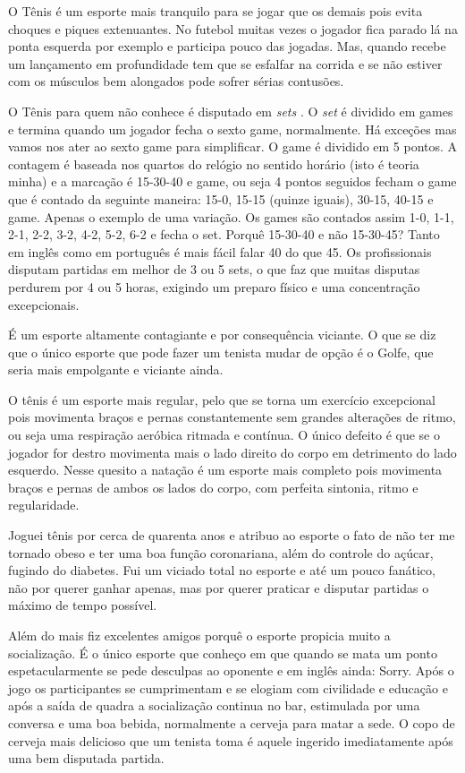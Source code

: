 \documentclass[12pt,brazil,]{book}
\begin{document}
O Tênis é um esporte mais tranquilo para se jogar que os demais pois
evita choques e piques extenuantes. No futebol muitas vezes o jogador
fica parado lá na ponta esquerda por exemplo e participa pouco das
jogadas. Mas, quando recebe um lançamento em profundidade tem que se
esfalfar na corrida e se não estiver com os músculos bem alongados pode
sofrer sérias contusões.

O Tênis para quem não conhece é disputado em \emph{sets} . O \emph{set}
é dividido em games e termina quando um jogador fecha o sexto game,
normalmente. Há exceções mas vamos nos ater ao sexto game para
simplificar. O game é dividido em 5 pontos. A contagem é baseada nos
quartos do relógio no sentido horário (isto é teoria minha) e a marcação
é 15-30-40 e game, ou seja 4 pontos seguidos fecham o game que é contado
da seguinte maneira: 15-0, 15-15 (quinze iguais), 30-15, 40-15 e game.
Apenas o exemplo de uma variação. Os games são contados assim 1-0, 1-1,
2-1, 2-2, 3-2, 4-2, 5-2, 6-2 e fecha o set. Porquê 15-30-40 e não
15-30-45? Tanto em inglês como em português é mais fácil falar 40 do que
45. Os profissionais disputam partidas em melhor de 3 ou 5 sets, o que
faz que muitas disputas perdurem por 4 ou 5 horas, exigindo um preparo
físico e uma concentração excepcionais.

É um esporte altamente contagiante e por consequência viciante. O que se
diz que o único esporte que pode fazer um tenista mudar de opção é o
Golfe, que seria mais empolgante e viciante ainda.

O tênis é um esporte mais regular, pelo que se torna um exercício
excepcional pois movimenta braços e pernas constantemente sem grandes
alterações de ritmo, ou seja uma respiração aeróbica ritmada e contínua.
O único defeito é que se o jogador for destro movimenta mais o lado
direito do corpo em detrimento do lado esquerdo. Nesse quesito a natação
é um esporte mais completo pois movimenta braços e pernas de ambos os
lados do corpo, com perfeita sintonia, ritmo e regularidade.

Joguei tênis por cerca de quarenta anos e atribuo ao esporte o fato de
não ter me tornado obeso e ter uma boa função coronariana, além do
controle do açúcar, fugindo do diabetes. Fui um viciado total no esporte
e até um pouco fanático, não por querer ganhar apenas, mas por querer
praticar e disputar partidas o máximo de tempo possível.

Além do mais fiz excelentes amigos porquê o esporte propicia muito a
socialização. É o único esporte que conheço em que quando se mata um
ponto espetacularmente se pede desculpas ao oponente e em inglês ainda:
Sorry. Após o jogo os participantes se cumprimentam e se elogiam com
civilidade e educação e após a saída de quadra a socialização continua
no bar, estimulada por uma conversa e uma boa bebida, normalmente a
cerveja para matar a sede. O copo de cerveja mais delicioso que um
tenista toma é aquele ingerido imediatamente após uma bem disputada
partida.
\end{document}
